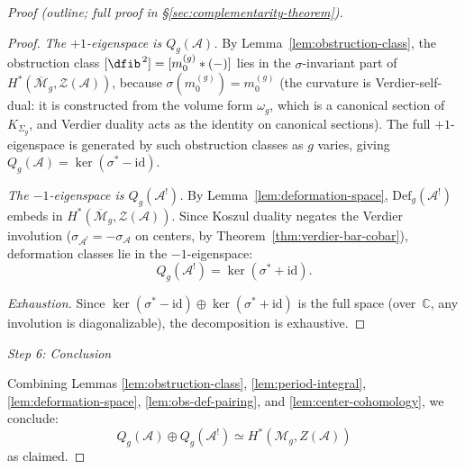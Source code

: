 \begin{proof}[Proof (outline; full proof in \S\textup{\ref{sec:complementarity-theorem}})]
\begin{proof}
\emph{The $+1$-eigenspace is $Q_g(\mathcal{A})$.}
By Lemma~\ref{lem:obstruction-class}, the obstruction class
$[\dfib^{\,2}] = [m_0^{(g)} \ast (-)]$ lies in the $\sigma$-invariant part
of $H^*(\overline{\mathcal{M}}_g, \mathcal{Z}(\mathcal{A}))$, because
$\sigma(m_0^{(g)}) = m_0^{(g)}$ (the curvature is Verdier-self-dual:
it is constructed from the volume form $\omega_g$, which is a canonical
section of $K_{\Sigma_g}$, and Verdier duality acts as the identity on
canonical sections).  The full $+1$-eigenspace is generated by such
obstruction classes as $g$ varies, giving
$Q_g(\mathcal{A}) = \ker(\sigma^* - \mathrm{id})$.

\emph{The $-1$-eigenspace is $Q_g(\mathcal{A}^!)$.}
By Lemma~\ref{lem:deformation-space},
$\mathrm{Def}_g(\mathcal{A}^!)$ embeds in
$H^*(\overline{\mathcal{M}}_g, \mathcal{Z}(\mathcal{A}))$.
Since Koszul duality negates the Verdier involution
($\sigma_{\mathcal{A}^!} = -\sigma_{\mathcal{A}}$
on centers, by Theorem~\ref{thm:verdier-bar-cobar}),
deformation classes lie in the $-1$-eigenspace:
\[
Q_g(\mathcal{A}^!) = \ker(\sigma^* + \mathrm{id}).
\]

\emph{Exhaustion.}
Since $\ker(\sigma^* - \mathrm{id}) \oplus \ker(\sigma^* + \mathrm{id})$
is the full space (over~$\mathbb{C}$, any involution is diagonalizable),
the decomposition is exhaustive.
\end{proof}

\emph{Step 6: Conclusion}

Combining Lemmas \ref{lem:obstruction-class}, \ref{lem:period-integral}, 
\ref{lem:deformation-space}, \ref{lem:obs-def-pairing}, and \ref{lem:center-cohomology}, 
we conclude:
\[Q_g(\mathcal{A}) \oplus Q_g(\mathcal{A}^!) \simeq H^*(\mathcal{M}_g, Z(\mathcal{A}))\]
as claimed.

\end{proof}

